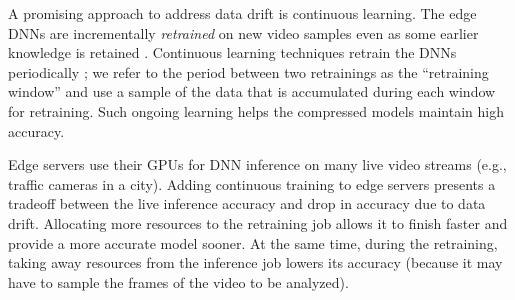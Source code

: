  A promising approach to address data drift is continuous learning. The edge DNNs are incrementally {\em retrained} on new video samples even as some earlier knowledge is retained \cite{compressiondrift-11, continuous-12}. Continuous learning techniques retrain the DNNs periodically %
\cite{distribution-20, mullapudi2019}; we refer to the period between two retrainings as the ``retraining window'' and use a sample of the data that is accumulated during each window for retraining. 
Such ongoing learning \cite{incremental-13, icarl-14, incremental-15} %
helps the compressed models maintain high accuracy.%

Edge servers use their GPUs \cite{azure-ase} for DNN inference on many live video streams (e.g., traffic cameras in a city).  %
Adding continuous training to edge servers presents a tradeoff between the live inference accuracy and drop in accuracy due to data drift. Allocating more resources to the retraining job allows it to finish faster and provide a more accurate model sooner. At the same time, during the retraining, taking away resources from the inference job lowers its accuracy (because it may have to sample the frames of the video to be analyzed).%

